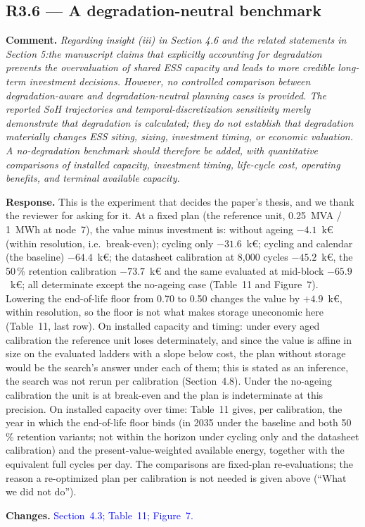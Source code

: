 \documentclass[11pt]{article}
\newcommand{\rcomment}[1]{\par\medskip\noindent\textbf{Comment.} \textit{#1}\par\smallskip}
\newcommand{\rresponse}[1]{\noindent\textbf{Response.} #1\par\smallskip}
\newcommand{\rchanges}[1]{\noindent\textbf{Changes.} \textcolor{blue}{#1}\par\medskip}
\begin{document}
\subsection*{R3.6 --- A degradation-neutral benchmark}
\rcomment{
Regarding insight (iii) in Section 4.6 and the related statements in Section 5:the manuscript claims that explicitly accounting for degradation prevents the overvaluation of shared ESS capacity and leads to more credible long-term investment decisions. However, no controlled comparison between degradation-aware and degradation-neutral planning cases is provided. The reported SoH trajectories and temporal-discretization sensitivity merely demonstrate that degradation is calculated; they do not establish that degradation materially changes ESS siting, sizing, investment timing, or economic valuation. A no-degradation benchmark should therefore be added, with quantitative comparisons of installed capacity, investment timing, life-cycle cost, operating benefits, and terminal available capacity.
}
\rresponse{This is the experiment that decides the paper's thesis, and we thank the reviewer for asking for it. At a fixed plan (the reference unit, 0.25~MVA / 1~MWh at node~7), the value minus investment is: without ageing $-4.1$~k\euro{} (within resolution, i.e.\ break-even); cycling only $-31.6$~k\euro{}; cycling and calendar (the baseline) $-64.4$~k\euro{};  the datasheet calibration at 8,000 cycles $-45.2$~k\euro{}, the 50\,\% retention calibration $-73.7$~k\euro{} and the same evaluated at mid-block $-65.9$~k\euro{}; all determinate except the no-ageing case (Table~11 and Figure~7).
Lowering the end-of-life floor from 0.70 to 0.50 changes the value by $+4.9$~k\euro{}, within resolution, so the floor is not what makes storage uneconomic here (Table~11, last row). On installed capacity and timing: under every aged calibration the reference unit loses determinately, and since the value is affine in size on the evaluated ladders with a slope below cost, the plan without storage would be the search's answer under each of them; this is stated as an inference, the search was not rerun per calibration (Section~4.8). Under the no-ageing calibration the unit is at break-even and the plan is indeterminate at this precision. On installed capacity over time: Table~11 gives, per calibration, the year in which the end-of-life floor binds (in 2035 under the baseline and both 50\,\% retention variants; not within the horizon under cycling only and the datasheet calibration) and the present-value-weighted available energy, together with the equivalent full cycles per day. The comparisons are fixed-plan re-evaluations; the reason a re-optimized plan per calibration is not needed is given above (``What we did not do'').}
\rchanges{Section~4.3; Table~11; Figure~7.}
\end{document}
